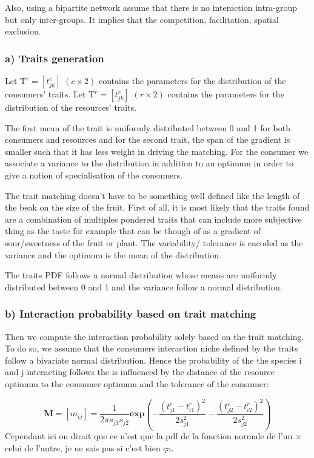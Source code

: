 \documentclass{article}
\begin{document}
Also, using a bipartite network assume that there is no interaction intra-group but only inter-groups. It implies that the competition, facilitation, spatial exclusion.




\subsubsection{a) Traits generation}
Let $\textrm{T}^c = [t^c_{jk}]$ $(c \times 2)$ contains the parameters for the distribution of the consumers' traits. 
Let $\textrm{T}^r = [t^r_{jk}]$ $(r \times 2)$ contains the parameters for the distribution of the resources' traits. 

The first mean of the trait is uniformly distributed between 0 and 1 for both consumers and resources and for the second trait, the span of the gradient is smaller such that it has less weight in driving the matching. 
For the consumer we associate a variance to the distribution in addition to an optimum in order to give a notion of specialisation of the consumers.

The trait matching doesn't have to be something well defined like the length of the beak on the size of the fruit. First of all, it is most likely that the traits found are a combination of multiples pondered traits that can include more subjective thing as the taste for example that can be though of as a gradient of sour/sweetness of the fruit or plant.
The variability/ tolerance is encoded as the variance and the optimum is the mean of the distribution.

The traits PDF follows a normal distribution whose means are uniformly distributed between 0 and 1 and the variance follow a normal distribution.




\subsubsection{b) Interaction probability based on trait matching}
Then we compute the interaction probability  solely based on the trait matching. To do so, we assume that the consumers interaction niche defined by the traits follow a bivariate normal distribution. Hence the probability of the the species i and j interacting follows the is influenced by the distance of the resource optimum to the consumer optimum and the tolerance of the consumer:

$$\textbf{M} = [m_{ij}]=\frac{1}{2\pi s_{j1}s_{j2}} \textbf{exp}\left(-\frac{(t^c_{j1} - t^r_{i1})^2}{2s^2_{j1}} - \frac{(t^c_{j2} - t^r_{i2})^2}{2s^2_{j2}}\right)$$
Cependant ici on dirait que ce n'est que la pdf de la fonction normale de l'un $\times$ celui de l'autre, je ne sais pas si c'est bien ça.
\end{document}
